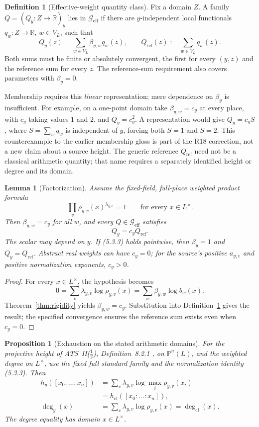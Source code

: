\documentclass[11pt,a4paper]{article}
\newtheorem{lemma}[theorem]{Lemma}
\newtheorem{proposition}[theorem]{Proposition}
\theoremstyle{definition}
\newtheorem{definition}[theorem]{Definition}
\theoremstyle{remark}
\newcommand{\Geff}{\mathcal{G}_{\mathrm{eff}}}
\begin{document}
\begin{definition}[Effective-weight quantity class]\label{def:geff}
Fix a domain $Z$. A family $Q=(Q_y:Z\to\mathbb R)_y$ lies in $\Geff$
if there are $y$-independent local functionals $q_w:Z\to\mathbb R$,
$w\in V_L$, such that
\[
Q_y(z)=\sum_{w\in V_L}\beta_{y,w}q_w(z),
\qquad Q_{\mathrm{ref}}(z):=\sum_{w\in V_L}q_w(z).
\]
Both sums must be finite or absolutely convergent, the first for every
$(y,z)$ and the reference sum for every $z$. The reference-sum requirement
also covers parameters with $\beta_y=0$.
\end{definition}

Membership requires this \emph{linear} representation; mere dependence on
$\beta_y$ is insufficient. For example, on a one-point domain take
$\beta_{y,w}=c_y$ at every place, with $c_y$ taking values $1$ and $2$,
and $Q_y=c_y^2$. A representation would give $Q_y=c_y S$, where
$S=\sum_wq_w$ is independent of $y$, forcing both $S=1$ and $S=2$.
This counterexample to the earlier membership gloss is part of the R18
correction, not a new claim about a source height.
The generic reference $Q_{\mathrm{ref}}$ need not be a classical
arithmetic quantity; that name requires a separately identified height or
degree and its domain.

\begin{lemma}[Factorization]\label{lem:factorization}
Assume the fixed-field, full-place weighted product formula
\[
\prod_v\rho_{y,v}(x)^{\lambda_{y,v}}=1
\qquad\text{for every }x\in L^\times.
\]
Then $\beta_{y,w}=c_y$ for all $w$, and every $Q\in\Geff$ satisfies
\[
Q_y=c_yQ_{\mathrm{ref}}.
\]
The scalar may depend on $y$. If (5.3.3) holds pointwise, then
$\beta_y=1$ and $Q_y=Q_{\mathrm{ref}}$.
Abstract real weights can have $c_y=0$; for the source's positive
$a_{y,v}$ and positive normalization exponents, $c_y>0$.
\end{lemma}

\begin{proof}
For every $x\in L^\times$, the hypothesis becomes
\[
0=\sum_v\lambda_{y,v}\log\rho_{y,v}(x)
=\sum_w\beta_{y,w}\log b_w(x).
\]
Theorem~\ref{thm:rigidity} yields $\beta_{y,w}=c_y$.
Substitution into Definition~\ref{def:geff} gives the result; the specified
convergence ensures the reference sum exists even when $c_y=0$.
\end{proof}

\begin{proposition}[Exhaustion on the stated arithmetic domains]\label{prop:exhaustion}
For the projective height of ATS~II($\tfrac12$), Definition~8.2.1
\cite{joshiIIhalf}, on $\mathbb P^n(L)$, and the weighted degree on
$L^\times$, use the fixed full standard family and the normalization
identity (5.3.3). Then
\begin{align*}
h_y([x_0:\dots:x_n])
&=\sum_v\lambda_{y,v}\log\max_i\rho_{y,v}(x_i)\\
&=h_{\mathrm{cl}}([x_0:\dots:x_n]),\\
\deg_y(x)&=\sum_v\lambda_{y,v}\log\rho_{y,v}(x)
=\deg_{\mathrm{cl}}(x).
\end{align*}
The degree equality has domain $x\in L^\times$.
\end{proposition}
\end{document}
